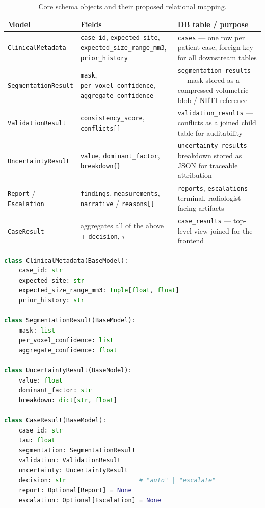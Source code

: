 \documentclass[11pt,a4paper]{article}
\begin{document}
\begin{table}[htbp]
\centering
\caption{Core schema objects and their proposed relational mapping.}
\label{tab:schema}
\small
\begin{tabular}{p{2.6cm}p{4.6cm}p{5.3cm}}
\toprule
\textbf{Model} & \textbf{Fields} & \textbf{DB table / purpose} \\
\midrule
\texttt{ClinicalMetadata} & \texttt{case\_id}, \texttt{expected\_site}, \texttt{expected\_size\_range\_mm3}, \texttt{prior\_history} & \texttt{cases} --- one row per patient case, foreign key for all downstream tables \\
\texttt{SegmentationResult} & \texttt{mask}, \texttt{per\_voxel\_confidence}, \texttt{aggregate\_confidence} & \texttt{segmentation\_results} --- mask stored as a compressed volumetric blob / NIfTI reference \\
\texttt{ValidationResult} & \texttt{consistency\_score}, \texttt{conflicts[]} & \texttt{validation\_results} --- conflicts as a joined child table for auditability \\
\texttt{UncertaintyResult} & \texttt{value}, \texttt{dominant\_factor}, \texttt{breakdown\{\}} & \texttt{uncertainty\_results} --- breakdown stored as JSON for traceable attribution \\
\texttt{Report} / \texttt{Escalation} & \texttt{findings}, \texttt{measurements}, \texttt{narrative} / \texttt{reasons[]} & \texttt{reports}, \texttt{escalations} --- terminal, radiologist-facing artifacts \\
\texttt{CaseResult} & aggregates all of the above + \texttt{decision}, $\tau$ & \texttt{case\_results} --- top-level view joined for the frontend \\
\bottomrule
\end{tabular}
\end{table}

\begin{lstlisting}[language=Python, caption={Core Pydantic schema (abridged), from \texttt{mars/models.py}. Every agent consumes and returns one of these objects, giving the pipeline a fully typed, auditable data contract.}, label=lst:schema]
class ClinicalMetadata(BaseModel):
    case_id: str
    expected_site: str
    expected_size_range_mm3: tuple[float, float]
    prior_history: str

class SegmentationResult(BaseModel):
    mask: list
    per_voxel_confidence: list
    aggregate_confidence: float

class UncertaintyResult(BaseModel):
    value: float
    dominant_factor: str
    breakdown: dict[str, float]

class CaseResult(BaseModel):
    case_id: str
    tau: float
    segmentation: SegmentationResult
    validation: ValidationResult
    uncertainty: UncertaintyResult
    decision: str                    # "auto" | "escalate"
    report: Optional[Report] = None
    escalation: Optional[Escalation] = None
\end{lstlisting}
\end{document}
